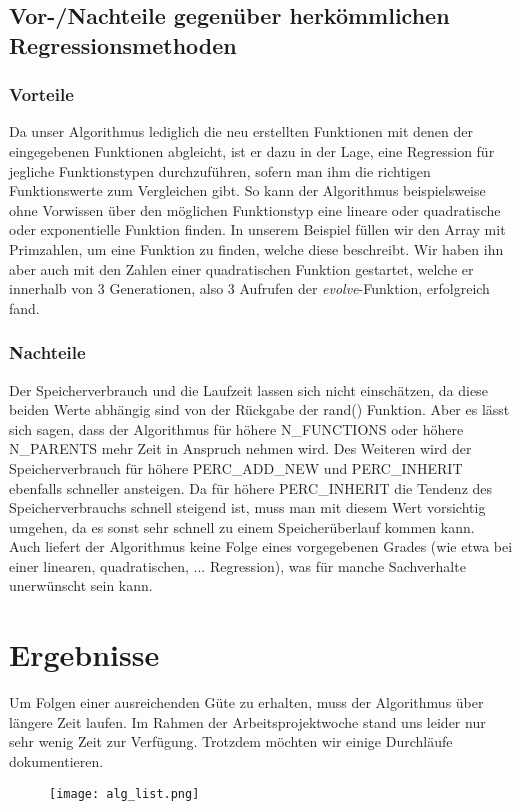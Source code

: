 \documentclass[a4paper,12pt]{article}
\begin{document}
\subsection{Vor-/Nachteile gegenüber herkömmlichen Regressionsmethoden}
\subsubsection{Vorteile}
Da unser Algorithmus lediglich die neu erstellten Funktionen mit denen der eingegebenen Funktionen abgleicht, ist er dazu in der Lage, eine Regression für jegliche Funktionstypen durchzuführen, sofern man ihm die richtigen Funktionswerte zum Vergleichen gibt. So kann der Algorithmus beispielsweise ohne Vorwissen über den möglichen Funktionstyp eine lineare oder quadratische oder exponentielle Funktion finden. In unserem Beispiel füllen wir den Array mit Primzahlen, um eine Funktion zu finden, welche diese beschreibt. Wir haben ihn aber auch mit den Zahlen einer quadratischen Funktion gestartet, welche er innerhalb von 3 Generationen, also 3 Aufrufen der \emph{evolve}-Funktion, erfolgreich fand. \\

\subsubsection{Nachteile}
Der Speicherverbrauch und die Laufzeit lassen sich nicht einschätzen, da diese beiden Werte abhängig sind von der Rückgabe der rand() Funktion. Aber es lässt sich sagen, dass der Algorithmus für höhere N\_FUNCTIONS oder höhere N\_PARENTS mehr Zeit in Anspruch nehmen wird. Des Weiteren wird der Speicherverbrauch für höhere PERC\_ADD\_NEW und PERC\_INHERIT ebenfalls schneller ansteigen. Da für höhere PERC\_INHERIT die Tendenz des Speicherverbrauchs schnell steigend ist, muss man mit diesem Wert vorsichtig umgehen, da es sonst sehr schnell zu einem Speicherüberlauf kommen kann.\\
Auch liefert der Algorithmus keine Folge eines vorgegebenen Grades (wie etwa bei einer linearen, quadratischen, ... Regression), was für manche Sachverhalte unerwünscht sein kann.
\newpage

\section{Ergebnisse}
Um Folgen einer ausreichenden Güte zu erhalten, muss der Algorithmus über längere Zeit laufen. Im Rahmen der Arbeitsprojektwoche stand uns leider nur sehr wenig Zeit zur Verfügung. Trotzdem möchten wir einige Durchläufe dokumentieren.\\
\begin{figure}
\texttt{[image: alg\_list.png]}
\end{figure}
\newpage
\end{document}
